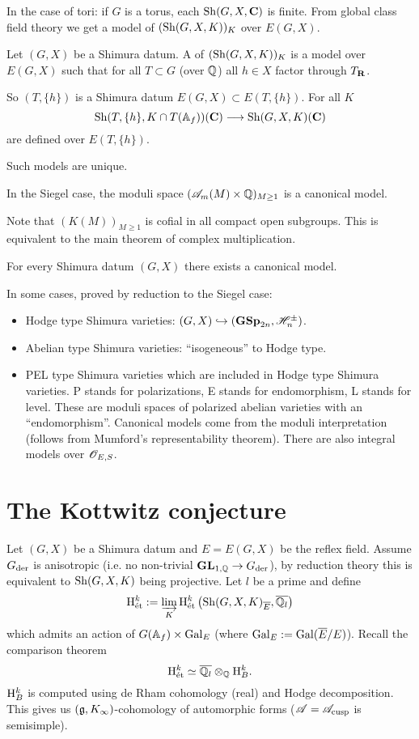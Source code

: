 In the case of tori: if $G$ is a torus, each $\operatorname{Sh}(G,X,\mathbf{C})$ is finite. From global class
field theory we get a model of $(\operatorname{Sh}(G,X,K))_K$ over $E(G,X)$.

\begin{definition}
Let $(G,X)$ be a Shimura datum. A  of $(\operatorname{Sh}(G,X,K))_K$ is a model
over $E(G,X)$ such that for all  $T\subset G$ (over $\mathbb Q$) all $h\in X$ factor through $T_\mathbf{R}$.
\end{definition}
So $(T,\{h\} )$ is a Shimura datum $E(G,X)\subset E(T,\{h\} )$. For all $K$
\[
\Sh(T,\{h\} , K\cap T(\A_f))(\C) \to \Sh(G,X,K)(\C)
\]
are defined over $E(T,\{h\} )$.

\begin{proposition}
Such models are unique.
\end{proposition}
\begin{theorem}
In the Siegel case, the moduli space $(\mathscr{A}_m(M)\times \mathbb Q)_{M\ge 1}$ is a canonical model.
\end{theorem}
Note that $(K(M))_{M\ge 1}$ is cofial in all compact open subgroups. This is equivalent
to the main theorem of complex multiplication.

\begin{theorem}
For every Shimura datum $(G,X)$ there exists a canonical model.
\end{theorem}
In some cases, proved by reduction to the Siegel case:
\begin{itemize}
\item Hodge type Shimura varieties: $(G,X) \hookrightarrow (\mathbf{GSp}_{2n}, \mathscr H_n^{\pm})$.
\item Abelian type Shimura varieties: ``isogeneous'' to Hodge type.
\item PEL type Shimura varieties which are included in Hodge type Shimura varieties. P
stands for polarizations, E stands for endomorphism, L stands for level. These are moduli
spaces of polarized abelian varieties with an ``endomorphism''. Canonical models come
from the moduli interpretation (follows from Mumford's representability theorem). There
are also integral models over $\mathscr{O}_{E,S}$.
\end{itemize}

\section{The Kottwitz conjecture}
Let $(G,X)$ be a Shimura datum and $E=E(G,X)$ be the reflex field. Assume $G_{\mathrm{der}}$ is
anisotropic (i.e. no non-trivial $\GL_{1,\Q}\to G\der$), by reduction theory this is
equivalent to $\operatorname{Sh}(G,X,K)$ being projective. Let $l$ be a prime and define
\[
\mathrm{H}^{k}_{\text{\'et}} := \varinjlim_K \mathrm{H}^{k}_{\text{\'et}}\left( \operatorname{Sh}(G,X,K)_{\overline{E}}, \overline{\mathbb Q_l} \right)
\]
which admits an action of $G(\mathbb{A}_f)\times \operatorname{Gal}_E$ (where $\operatorname{Gal}_E:= \operatorname{Gal}(\overline{E}
/E)$). Recall the comparison theorem
\[
\mathrm{H}^{k}_{\text{\'et}} \simeq \overline{\mathbb Q_l} \otimes_\mathbb Q \mathrm{H}_B^{k}.
\]
$\mathrm{H}_B^{k}$ is computed using de Rham cohomology (real) and Hodge decomposition. This
gives us $(\mathfrak{g},K_{\infty})$-cohomology of automorphic forms ($\mathscr{A}=\mathscr{A}_{\text{cusp}}$ is semisimple).

